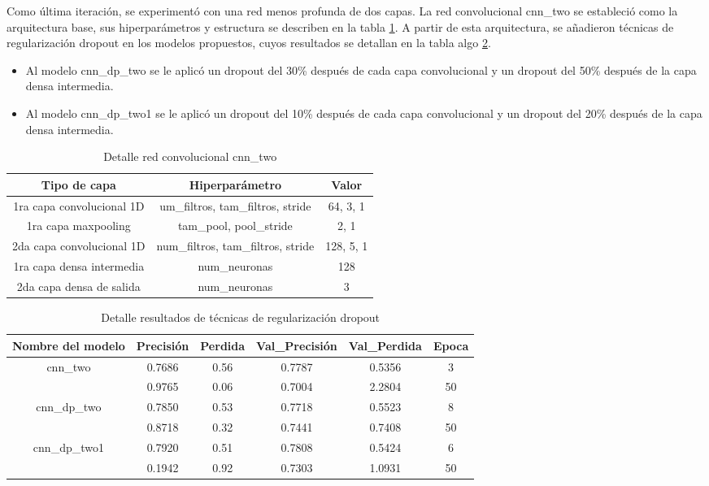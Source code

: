 Como última iteración, se experimentó con una red menos profunda de dos capas. La red convolucional cnn\_two se estableció como la arquitectura base, sus hiperparámetros y estructura se describen en la tabla \ref{tbl:11}. A partir de esta arquitectura, se añadieron técnicas de regularización dropout en los modelos propuestos, cuyos resultados se detallan en la tabla algo \ref{tbl:12}.

\begin{itemize}

\item Al modelo cnn\_dp\_two se le aplicó un dropout del 30\% después de cada capa convolucional y un dropout del 50\% después de la capa densa intermedia.

\item Al modelo cnn\_dp\_two1 se le aplicó un dropout del 10\% después de cada capa convolucional y un dropout del 20\% después de la capa densa intermedia.
\end{itemize}

\begin{table}[!ht]
	\centering
	\begin{tabular}{|c|c|c|}
		\hline
		\textbf{Tipo de capa} & \textbf{Hiperparámetro } & \textbf{Valor} \\ \hline
		1ra capa convolucional 1D & um\_filtros, tam\_filtros, stride & 64, 3, 1 \\ \hline
		1ra capa maxpooling & tam\_pool, pool\_stride & 2, 1 \\ \hline
		2da capa convolucional 1D & num\_filtros, tam\_filtros, stride & 128, 5, 1 \\ \hline
		1ra capa densa intermedia & num\_neuronas & 128 \\ \hline
		2da capa densa de salida & num\_neuronas & 3 \\ \hline
	\end{tabular}
	\caption{Detalle red convolucional cnn\_two}
	\label{tbl:11}
\end{table}


\begin{table}[!ht]
	\centering
	\begin{tabular}{|c|c|c|c|c|c|}
		\hline
		\textbf{Nombre del modelo} & \textbf{Precisión} & \textbf{Perdida} & \textbf{Val\_Precisión} & \textbf{Val\_Perdida} & \textbf{Epoca} \\ \hline
		cnn\_two & 0.7686 & 0.56 & 0.7787 & 0.5356 & 3 \\ \cline{2-6}
		~ & 0.9765 & 0.06 & 0.7004 & 2.2804 & 50 \\ \hline
		cnn\_dp\_two & 0.7850 & 0.53 & 0.7718 & 0.5523 & 8 \\ \cline{2-6}
		~ & 0.8718 & 0.32 & 0.7441 & 0.7408 & 50 \\ \hline
		cnn\_dp\_two1 & 0.7920 & 0.51 & 0.7808 & 0.5424 & 6 \\ \cline{2-6}
		~ & 0.1942 & 0.92 & 0.7303 & 1.0931 & 50 \\ \hline
	\end{tabular}
	\caption{Detalle resultados de técnicas de regularización dropout}
	\label{tbl:12}
\end{table}
